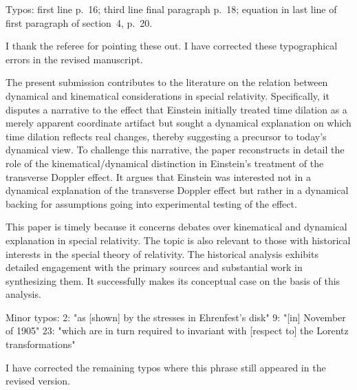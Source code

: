\documentclass[submitted,11pt]{article}
\begin{document}
\begin{point}
Typos: first line p.~16; third line final paragraph p.~18; equation in last line of first paragraph of section~4, p.~20.
\end{point}

\begin{reply}
I thank the referee for pointing these out. I have corrected these typographical errors in the revised manuscript.
\end{reply}


\reviewersection

\begin{point}
The present submission contributes to the literature on the relation between
dynamical and kinematical considerations in special relativity.  Specifically,
it disputes a narrative to the effect that Einstein initially treated time
dilation as a merely apparent coordinate artifact but sought a dynamical
explanation on which time dilation reflects real changes, thereby suggesting a
precursor to today's dynamical view.  To challenge this narrative, the paper
reconstructs in detail the role of the kinematical/dynamical distinction in
Einstein's treatment of the transverse Doppler effect.  It argues that Einstein
was interested not in a dynamical explanation of the transverse Doppler effect
but rather in a dynamical backing for assumptions going into experimental
testing of the effect.  

This paper is timely because it concerns debates over kinematical and dynamical
explanation in special relativity.  The topic is also relevant to those with
historical interests in the special theory of relativity.  The historical
analysis exhibits detailed engagement with the primary sources and substantial
work in synthesizing them.  It successfully makes its conceptual case on the
basis of this analysis.

Minor typos:
2: "as [shown] by the stresses in Ehrenfest's disk"
9: "[in] November of 1905"
23: "which are in turn required to invariant with [respect to] the Lorentz
transformations"
\end{point}

\begin{reply}
I have corrected the remaining typos where this phrase still appeared in the revised version.
\end{reply}
\end{document}
